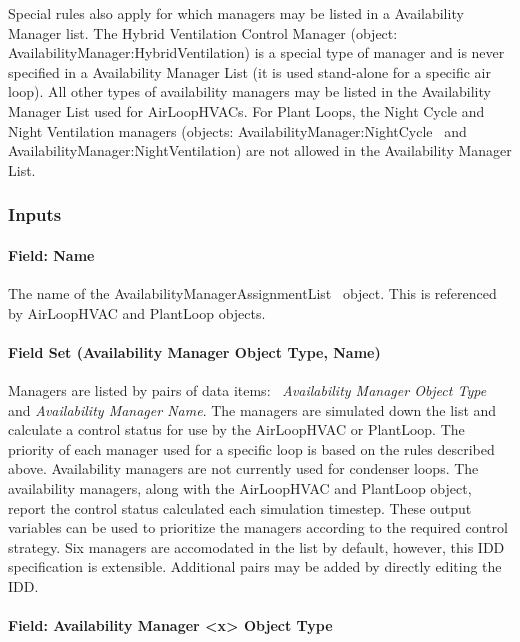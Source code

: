 Special rules also apply for which managers may be listed in a Availability Manager list. The Hybrid Ventilation Control Manager (object: AvailabilityManager:HybridVentilation) is a special type of manager and is never specified in a Availability Manager List (it is used stand-alone for a specific air loop). All other types of availability managers may be listed in the Availability Manager List used for AirLoopHVACs. For Plant Loops, the Night Cycle and Night Ventilation managers (objects: AvailabilityManager:NightCycle ~and AvailabilityManager:NightVentilation) are not allowed in the Availability Manager List.

\subsubsection{Inputs}\label{inputs-2-002}

\paragraph{Field: Name}\label{field-name-2-001}

The name of the AvailabilityManagerAssignmentList ~object. This is referenced by AirLoopHVAC and PlantLoop objects.

\paragraph{Field Set (Availability Manager Object Type, Name)}\label{field-set-availability-manager-object-type-name}

Managers are listed by pairs of data items:~ \emph{Availability Manager Object Type} and \emph{Availability Manager Name}. The managers are simulated down the list and calculate a control status for use by the AirLoopHVAC or PlantLoop. The priority of each manager used for a specific loop is based on the rules described above. Availability managers are not currently used for condenser loops. The availability managers, along with the AirLoopHVAC and PlantLoop object, report the control status calculated each simulation timestep. These output variables can be used to prioritize the managers according to the required control strategy. Six managers are accomodated in the list by default, however, this IDD specification is extensible. Additional pairs may be added by directly editing the IDD.

\paragraph{Field: Availability Manager \textless{}x\textgreater{} Object Type}\label{field-availability-manager-x-object-type}

